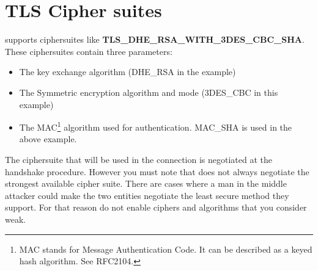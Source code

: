 \newpage
\section{TLS Cipher suites}
\par 
\tlsI supports ciphersuites like {\bf TLS\_DHE\_RSA\_WITH\_3DES\_CBC\_SHA}.
These ciphersuites contain three parameters:
\begin{itemize}
\item The key exchange algorithm (DHE\_RSA in the example)
\item The Symmetric encryption algorithm and mode (3DES\_CBC in this
example)
\item The MAC\footnote{MAC stands for Message Authentication Code. It can
be described as a keyed hash algorithm. See RFC2104.} algorithm used for authentication.
MAC\_SHA is used in the above example.
\end{itemize}

The ciphersuite that will be used in the connection is negotiated at
the handshake procedure. However you must note that \tlsI does not always
negotiate the strongest available cipher suite. There are cases where
a man in the middle attacker could make the two entities negotiate
the least secure method they support. For that reason do not enable
ciphers and algorithms that you consider weak.

\addvspace{1.5cm}

